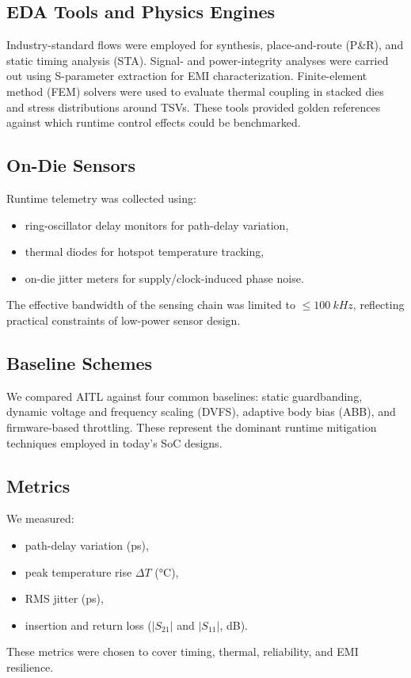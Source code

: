 \documentclass[conference]{IEEEtran}
\begin{document}
\subsection{EDA Tools and Physics Engines}
Industry-standard flows were employed for synthesis, place-and-route (P\&R), and static timing analysis (STA). Signal- and power-integrity analyses were carried out using S-parameter extraction for EMI characterization. Finite-element method (FEM) solvers were used to evaluate thermal coupling in stacked dies and stress distributions around TSVs. These tools provided golden references against which runtime control effects could be benchmarked.

\subsection{On-Die Sensors}
Runtime telemetry was collected using:
\begin{itemize}
  \item ring-oscillator delay monitors for path-delay variation,
  \item thermal diodes for hotspot temperature tracking,
  \item on-die jitter meters for supply/clock-induced phase noise.
\end{itemize}
The effective bandwidth of the sensing chain was limited to $\leq \SI{100}{kHz}$, reflecting practical constraints of low-power sensor design.

\subsection{Baseline Schemes}
We compared AITL against four common baselines: static guardbanding, dynamic voltage and frequency scaling (DVFS), adaptive body bias (ABB), and firmware-based throttling. These represent the dominant runtime mitigation techniques employed in today’s SoC designs.

\subsection{Metrics}
We measured:
\begin{itemize}
  \item path-delay variation (ps),
  \item peak temperature rise $\Delta T$ (\si{\celsius}),
  \item RMS jitter (ps),
  \item insertion and return loss ($|S_{21}|$ and $|S_{11}|$, dB).
\end{itemize}
These metrics were chosen to cover timing, thermal, reliability, and EMI resilience.
\end{document}
